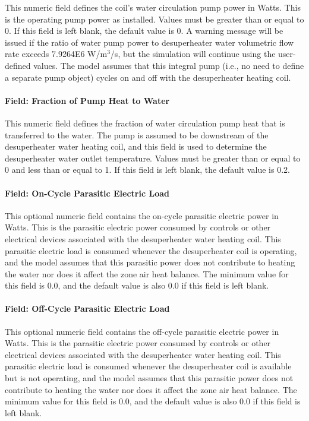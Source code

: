 This numeric field defines the coil's water circulation pump power in Watts. This is the operating pump power as installed. Values must be greater than or equal to 0. If this field is left blank, the default value is 0. A warning message will be issued if the ratio of water pump power to desuperheater water volumetric flow rate exceeds 7.9264E6 W/m\(^{3}\)/s, but the simulation will continue using the user-defined values. The model assumes that this integral pump (i.e., no need to define a separate pump object) cycles on and off with the desuperheater heating coil.

\paragraph{Field: Fraction of Pump Heat to Water}\label{field-fraction-of-pump-heat-to-water}

This numeric field defines the fraction of water circulation pump heat that is transferred to the water. The pump is assumed to be downstream of the desuperheater water heating coil, and this field is used to determine the desuperheater water outlet temperature. Values must be greater than or equal to 0 and less than or equal to 1. If this field is left blank, the default value is 0.2.

\paragraph{Field: On-Cycle Parasitic Electric Load}\label{field-on-cycle-parasitic-electric-load}

This optional numeric field contains the on-cycle parasitic electric power in Watts. This is the parasitic electric power consumed by controls or other electrical devices associated with the desuperheater water heating coil. This parasitic electric load is consumed whenever the desuperheater coil is operating, and the model assumes that this parasitic power does not contribute to heating the water nor does it affect the zone air heat balance. The minimum value for this field is 0.0, and the default value is also 0.0 if this field is left blank.

\paragraph{Field: Off-Cycle Parasitic Electric Load}\label{field-off-cycle-parasitic-electric-load}

This optional numeric field contains the off-cycle parasitic electric power in Watts. This is the parasitic electric power consumed by controls or other electrical devices associated with the desuperheater water heating coil. This parasitic electric load is consumed whenever the desuperheater coil is available but is not operating, and the model assumes that this parasitic power does not contribute to heating the water nor does it affect the zone air heat balance. The minimum value for this field is 0.0, and the default value is also 0.0 if this field is left blank.

